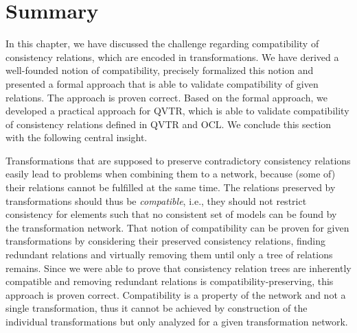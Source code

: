 \section{Summary}

In this chapter, we have discussed the challenge regarding compatibility of consistency relations, which are encoded in transformations.
We have derived a well-founded notion of compatibility, precisely formalized this notion and presented a formal approach that is able to validate compatibility of given relations.
The approach is proven correct.
Based on the formal approach, we developed a practical approach for \gls{QVTR}, which is able to validate compatibility of consistency relations defined in \gls{QVTR} and \gls{OCL}.
We conclude this section with the following central insight.

\begin{insight}[Compatibility]
    Transformations that are supposed to preserve contradictory consistency relations easily lead to problems when combining them to a network, because (some of) their relations cannot be fulfilled at the same time.
    The relations preserved by transformations should thus be \emph{compatible}, i.e., they should not restrict consistency for elements such that no consistent set of models can be found by the transformation network.
    That notion of compatibility can be proven for given transformations by considering their preserved consistency relations, finding redundant relations and virtually removing them until only a tree of relations remains. Since we were able to prove that consistency relation trees are inherently compatible and removing redundant relations is compatibility-preserving, this approach is proven correct.
    Compatibility is a property of the network and not a single transformation, thus it cannot be achieved by construction of the individual transformations but only analyzed for a given transformation network.
\end{insight}

